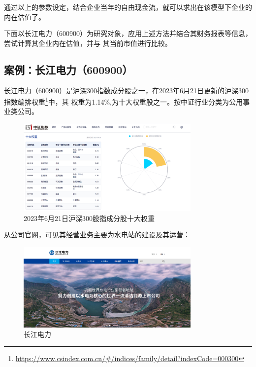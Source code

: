 \documentclass[UTF8]{ctexart}
\numberwithin{figure}{section}
\numberwithin{table}{section}
\numberwithin{equation}{section}
\begin{document}
        通过以上的参数设定，结合企业当年的自由现金流，就可以求出在该模型下企业的内在估值了。

        下面以长江电力（600900）为研究对象，应用上述方法并结合其财务报表等信息，尝试计算其企业内在估值，并与
    其当前市值进行比较。

    \subsection{案例：长江电力（600900）}

        长江电力（600900）是沪深300指数成分股之一，在2023年6月21日更新的沪深300指数编排权重\footnote{\url{https://www.csindex.com.cn/\#/indices/family/detail?indexCode=000300}}中，其
    权重为1.14\%,为十大权重股之一。按中证行业分类为公用事业类公司。

        \begin{figure}[H]
            \centering
            \includegraphics[width=0.8\textwidth]{Screenshot 2023-06-24 203818.png}
            \caption{2023年6月21日沪深300股指成分股十大权重}
        \end{figure}

        从公司官网，可见其经营业务主要为水电站的建设及其运营：

        \begin{figure}[H]
            \centering
            \includegraphics[width=0.8\textwidth]{Screenshot 2023-06-24 204212.png}
            \caption{长江电力}
        \end{figure}
\end{document}
